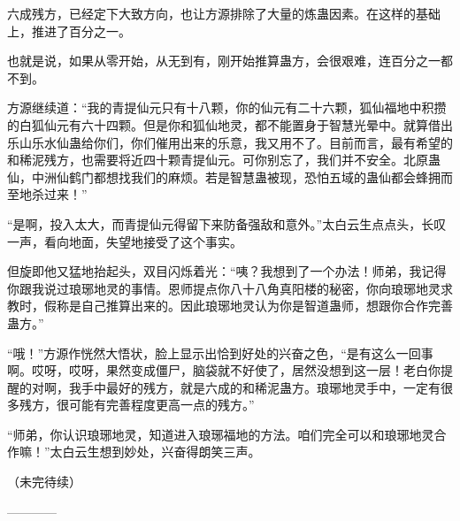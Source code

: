 \begin{this_body}
六成残方，已经定下大致方向，也让方源排除了大量的炼蛊因素。在这样的基础上，推进了百分之一。

也就是说，如果从零开始，从无到有，刚开始推算蛊方，会很艰难，连百分之一都不到。

方源继续道：“我的青提仙元只有十八颗，你的仙元有二十六颗，狐仙福地中积攒的白狐仙元有六十四颗。但是你和狐仙地灵，都不能置身于智慧光晕中。就算借出乐山乐水仙蛊给你们，你们催用出来的乐意，我又用不了。目前而言，最有希望的和稀泥残方，也需要将近四十颗青提仙元。可你别忘了，我们并不安全。北原蛊仙，中洲仙鹤门都想找我们的麻烦。若是智慧蛊被现，恐怕五域的蛊仙都会蜂拥而至地杀过来！”

“是啊，投入太大，而青提仙元得留下来防备强敌和意外。”太白云生点点头，长叹一声，看向地面，失望地接受了这个事实。

但旋即他又猛地抬起头，双目闪烁着光：“咦？我想到了一个办法！师弟，我记得你跟我说过琅琊地灵的事情。恩师提点你八十八角真阳楼的秘密，你向琅琊地灵求教时，假称是自己推算出来的。因此琅琊地灵认为你是智道蛊师，想跟你合作完善蛊方。”

“哦！”方源作恍然大悟状，脸上显示出恰到好处的兴奋之色，“是有这么一回事啊。哎呀，哎呀，果然变成僵尸，脑袋就不好使了，居然没想到这一层！老白你提醒的对啊，我手中最好的残方，就是六成的和稀泥蛊方。琅琊地灵手中，一定有很多残方，很可能有完善程度更高一点的残方。”

“师弟，你认识琅琊地灵，知道进入琅琊福地的方法。咱们完全可以和琅琊地灵合作嘛！”太白云生想到妙处，兴奋得朗笑三声。

（未完待续）

------------

\end{this_body}

